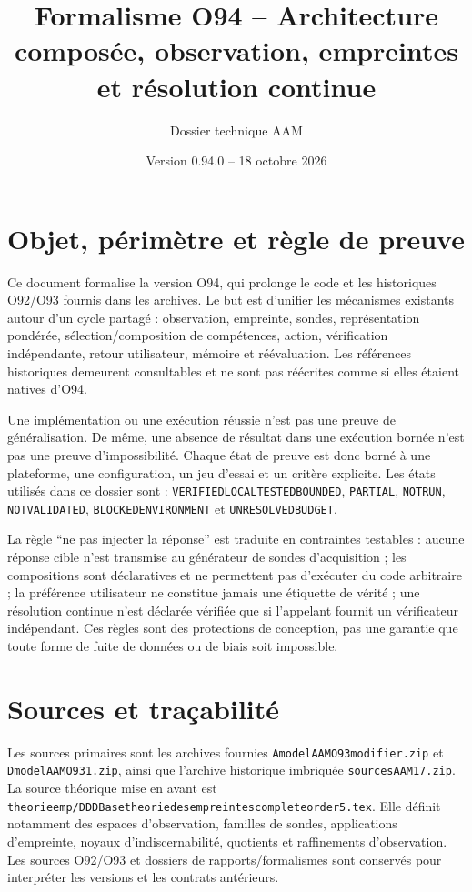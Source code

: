 \documentclass[11pt,a4paper]{article}
\title{Formalisme O94 -- Architecture composée, observation, empreintes et résolution continue}
\author{Dossier technique AAM}
\date{Version 0.94.0 -- 18 octobre 2026}
\begin{document}
\maketitle
\tableofcontents
\section{Objet, périmètre et règle de preuve}
Ce document formalise la version O94, qui prolonge le code et les historiques O92/O93 fournis dans les archives. Le but est d'unifier les mécanismes existants autour d'un cycle partagé : observation, empreinte, sondes, représentation pondérée, sélection/composition de compétences, action, vérification indépendante, retour utilisateur, mémoire et réévaluation. Les références historiques demeurent consultables et ne sont pas réécrites comme si elles étaient natives d'O94.

Une implémentation ou une exécution réussie n'est pas une preuve de généralisation. De même, une absence de résultat dans une exécution bornée n'est pas une preuve d'impossibilité. Chaque état de preuve est donc borné à une plateforme, une configuration, un jeu d'essai et un critère explicite. Les états utilisés dans ce dossier sont : \texttt{VERIFIED\textunderscore LOCAL\textunderscore TESTED\textunderscore BOUNDED}, \texttt{PARTIAL}, \texttt{NOT\textunderscore RUN}, \texttt{NOT\textunderscore VALIDATED}, \texttt{BLOCKED\textunderscore ENVIRONMENT} et \texttt{UNRESOLVED\textunderscore BUDGET}.

La règle ``ne pas injecter la réponse'' est traduite en contraintes testables : aucune réponse cible n'est transmise au générateur de sondes d'acquisition ; les compositions sont déclaratives et ne permettent pas d'exécuter du code arbitraire ; la préférence utilisateur ne constitue jamais une étiquette de vérité ; une résolution continue n'est déclarée vérifiée que si l'appelant fournit un vérificateur indépendant. Ces règles sont des protections de conception, pas une garantie que toute forme de fuite de données ou de biais soit impossible.

\section{Sources et traçabilité}
Les sources primaires sont les archives fournies \texttt{Amodel\textunderscore AAM\textunderscore O93\textunderscore modifier.zip} et \texttt{Dmodel\textunderscore AAM\textunderscore O93\textunderscore 1.zip}, ainsi que l'archive historique imbriquée \texttt{sources\textunderscore AAM\textunderscore 17.zip}. La source théorique mise en avant est \texttt{theorie\textunderscore emp/DDD\textunderscore Base\textunderscore theorie\textunderscore des\textunderscore empreintes\textunderscore complete\textunderscore order\textunderscore 5.tex}. Elle définit notamment des espaces d'observation, familles de sondes, applications d'empreinte, noyaux d'indiscernabilité, quotients et raffinements d'observation. Les sources O92/O93 et dossiers de rapports/formalismes sont conservés pour interpréter les versions et les contrats antérieurs.
\end{document}
